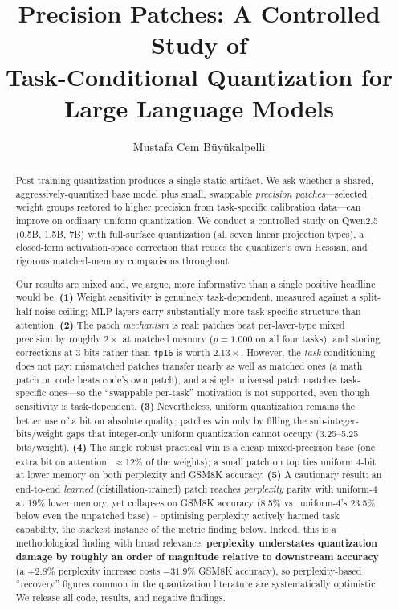 \documentclass[11pt]{article}
\title{\textbf{Precision Patches: A Controlled Study of\\
Task-Conditional Quantization for Large Language Models}}
\author{Mustafa Cem B\"uy\"ukalpelli}
\affil{\small Independent Researcher \\ \texttt{mustafacembuyukalpelli@gmail.com}}
\date{}
\newcommand{\bpw}{bits/weight}
\newcommand{\code}[1]{\texttt{#1}}
\begin{document}
\maketitle

\begin{abstract}
Post-training quantization produces a single static artifact. We ask whether a
shared, aggressively-quantized base model plus small, swappable
\emph{precision patches}---selected weight groups restored to higher
precision from task-specific calibration data---can improve on ordinary
uniform quantization. We conduct a controlled study on Qwen2.5 (0.5B, 1.5B,
7B) with full-surface quantization (all seven linear projection types), a
closed-form activation-space correction that reuses the quantizer's own
Hessian, and rigorous matched-memory comparisons throughout.

Our results are mixed and, we argue, more informative than a single positive
headline would be. \textbf{(1)} Weight sensitivity is genuinely
task-dependent, measured against a split-half noise ceiling; MLP layers carry
substantially more task-specific structure than attention. \textbf{(2)} The
patch \emph{mechanism} is real: patches beat per-layer-type mixed
precision by roughly $2\times$ at matched memory ($p{=}1.000$ on all four
tasks), and storing corrections at 3 bits rather than \code{fp16} is worth
$2.13\times$. However, the \emph{task}-conditioning does not pay: mismatched
patches transfer nearly as well as matched ones (a math patch on code beats
code's own patch), and a single universal patch matches task-specific ones---so
the ``swappable per-task'' motivation is not supported, even though sensitivity
is task-dependent. \textbf{(3)} Nevertheless, uniform quantization remains the
better use of a bit on absolute quality; patches win only by filling the
sub-integer-\bpw{} gaps that integer-only uniform quantization cannot occupy
(3.25--5.25 \bpw{}). \textbf{(4)} The single robust practical win is a cheap
mixed-precision base (one extra bit on attention, $\approx$12\% of the
weights); a small patch on top ties uniform 4-bit at lower memory on both
perplexity and GSM8K accuracy. \textbf{(5)} A cautionary
result: an end-to-end \emph{learned} (distillation-trained) patch reaches
\emph{perplexity} parity with uniform-4 at 19\% lower memory, yet collapses on
GSM8K accuracy (8.5\% vs.\ uniform-4's 23.5\%, below even the unpatched base) --
optimising perplexity actively harmed task capability, the starkest instance
of the metric finding below. Indeed, this is a methodological finding
with broad relevance: \textbf{perplexity understates quantization damage by
roughly an order of magnitude relative to downstream accuracy}
(a $+2.8\%$ perplexity increase costs $-31.9\%$ GSM8K accuracy), so
perplexity-based ``recovery'' figures common in the quantization literature
are systematically optimistic. We release all code, results, and negative
findings.
\end{abstract}
\end{document}
